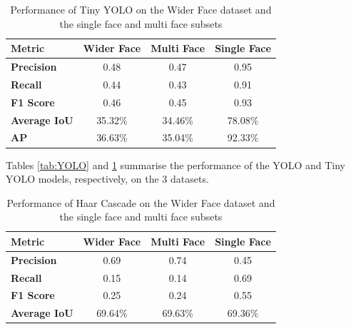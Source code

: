\begin{table}[h!]
\centering{}
\caption{Performance of Tiny YOLO on the Wider Face dataset and the single face and multi face subsets}
\begin{tabular}{|l|c|c|c|}
\hline
\textbf{Metric}      & \textbf{Wider Face} & \textbf{Multi Face}  & \textbf{Single Face} \\ \hline
\textbf{Precision}   & 0.48        & 0.47            & 0.95                 \\ \hline
\textbf{Recall}      & 0.44        & 0.43            & 0.91                 \\ \hline
\textbf{F1 Score}    & 0.46        & 0.45            & 0.93                 \\ \hline
\textbf{Average IoU} & 35.32\%     & 34.46\%         & 78.08\%              \\ \hline
\textbf{AP}          & 36.63\%     & 35.04\%         & 92.33\%              \\ \hline
\end{tabular}

\label{tab:TINYYOLO}
\end{table}

Tables \ref{tab:YOLO} and \ref{tab:TINYYOLO} summarise the performance of the YOLO and Tiny YOLO models, respectively, on the 3 datasets.

\begin{table}[h!]
\centering{}
\caption{Performance of Haar Cascade on the Wider Face dataset and the single face and multi face subsets}
\begin{tabular}{|l|c|c|c|}
\hline
\textbf{Metric}      & \textbf{Wider Face} & \textbf{Multi Face}  & \textbf{Single Face} \\ \hline
\textbf{Precision}   & 0.69      &  0.74           & 0.45               \\ \hline
\textbf{Recall}      & 0.15      &  0.14           & 0.69               \\ \hline
\textbf{F1 Score}    & 0.25      &  0.24           & 0.55               \\ \hline
\textbf{Average IoU} & 69.64\%   &  69.63\%        & 69.36\%            \\ \hline
\end{tabular}
\label{tab:HAAR}
\end{table}

